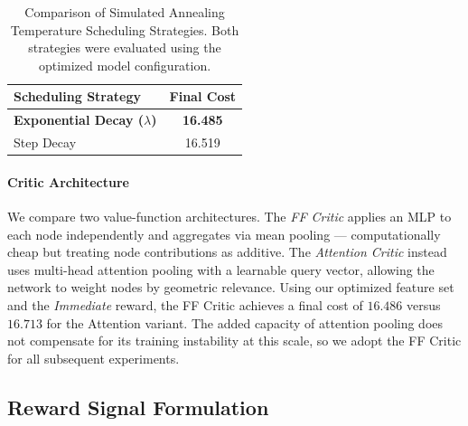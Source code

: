 \documentclass[letterpaper]{article} %
\begin{document}
\begin{table}[h]
\centering
\small
\caption{Comparison of Simulated Annealing Temperature Scheduling Strategies. Both strategies were evaluated using the optimized model configuration.}
\label{tab:temp_scheduling}
\begin{tabular}{l c}
\toprule
\textbf{Scheduling Strategy} & \textbf{Final Cost} \\
\midrule
\textbf{Exponential Decay ($\lambda$)} & \textbf{16.485} \\
Step Decay & 16.519 \\
\bottomrule
\end{tabular}
\end{table}


\paragraph{Critic Architecture}
We compare two value-function architectures. The \textit{FF Critic} applies an MLP to each node independently and aggregates via mean pooling — computationally cheap but treating node contributions as additive. The \textit{Attention Critic} instead uses multi-head attention pooling with a learnable query vector, allowing the network to weight nodes by geometric relevance. Using our optimized feature set and the \textit{Immediate} reward, the FF Critic achieves a final cost of $16.486$ versus $16.713$ for the Attention variant. The added capacity of attention pooling does not compensate for its training instability at this scale, so we adopt the FF Critic for all subsequent experiments.

\subsection{Reward Signal Formulation}
\label{sec:reward_formulation}
\end{document}
